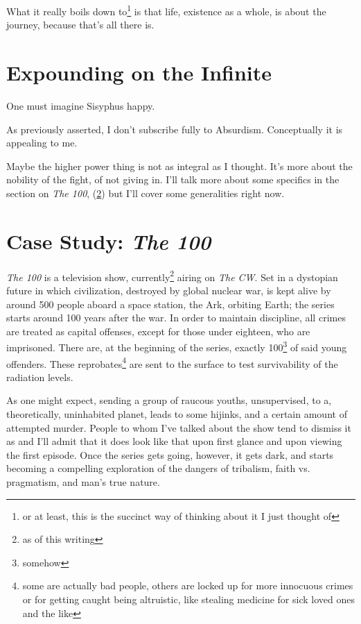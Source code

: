 \documentclass[../butidigress.tex]{subfiles}
\begin{document}
What it really boils down to\footnote{or at least, this is the succinct way of thinking about it I just thought of} is that life, existence as a whole, is about the journey, because that's all there is.\autocite{mythofsisyphus}

\section{Expounding on the Infinite}\label{sec:voidexpounding}
\epigraph{One must imagine Sisyphus happy.}{}
As previously asserted, I don't subscribe fully to Absurdism.
Conceptually it is appealing to me.

Maybe the higher power thing is not as integral as I thought.
It's more about the nobility of the fight, of not giving in.
I'll talk more about some specifics in the section on \textit{The 100}, (\ref{sec:thehundred}) but I'll cover some generalities right now.


\section{Case Study: \textit{The 100}}\label{sec:thehundred}
\textit{The 100} is a television show, currently\footnote{as of this writing} airing on \textit{The CW}.
Set in a dystopian future in which civilization, destroyed by global nuclear war, is kept alive by around 500 people aboard a space station, the Ark, orbiting Earth; the series starts around 100 years after the war.
In order to maintain discipline, all crimes are treated as capital offenses, except for those under eighteen, who are imprisoned.
There are, at the beginning of the series, exactly 100\footnote{somehow} of said young offenders.
These reprobates\footnote{some are actually bad people, others are locked up for more innocuous crimes or for getting caught being altruistic, like stealing medicine for sick loved ones and the like} are sent to the surface to test survivability of the radiation levels.

As one might expect, sending a group of raucous youths, unsupervised, to a, theoretically, uninhabited planet, leads to some hijinks, and a certain amount of attempted murder.
People to whom I've talked about the show tend to dismiss it as  and I'll admit that it does look like that upon first glance and upon viewing the first episode.
Once the series gets going, however, it gets dark, and starts becoming a compelling exploration of the dangers of tribalism, faith vs. pragmatism, and man's true nature.
\end{document}

